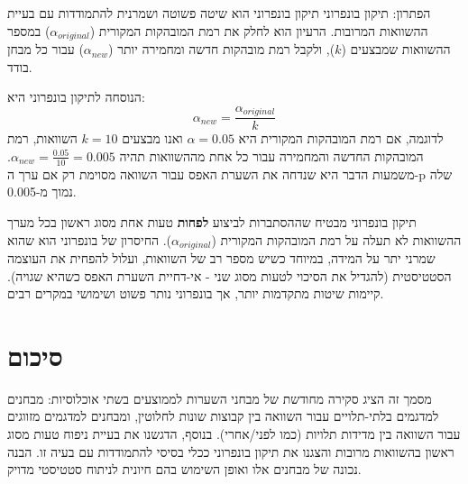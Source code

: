 \documentclass[12pt]{article}
\begin{document}
\begin{definitionBox}{הפתרון: תיקון בונפרוני}
תיקון בונפרוני הוא שיטה פשוטה ושמרנית להתמודדות עם בעיית ההשוואות המרובות. הרעיון הוא לחלק את רמת המובהקות המקורית (\(\alpha_{original}\)) במספר ההשוואות שמבצעים (\(k\)), ולקבל רמת מובהקות חדשה ומחמירה יותר (\(\alpha_{new}\)) עבור כל מבחן בודד.

\vspace{0.5\baselineskip} %
הנוסחה לתיקון בונפרוני היא:
\[ \alpha_{new} = \frac{\alpha_{original}}{k} \]
לדוגמה, אם רמת המובהקות המקורית היא \(\alpha = 0.05\) ואנו מבצעים \(k=10\) השוואות, רמת המובהקות החדשה והמחמירה עבור כל אחת מההשוואות תהיה \(\alpha_{new} = \frac{0.05}{10} = 0.005\). משמעות הדבר היא שנדחה את השערת האפס עבור השוואה מסוימת רק אם ערך ה-p שלה נמוך מ-0.005.

תיקון בונפרוני מבטיח שההסתברות לביצוע \textbf{לפחות} טעות אחת מסוג ראשון בכל מערך ההשוואות לא תעלה על רמת המובהקות המקורית (\(\alpha_{original}\)). החיסרון של בונפרוני הוא שהוא שמרני יתר על המידה, במיוחד כשיש מספר רב של השוואות, ועלול להפחית את העוצמה הסטטיסטית (להגדיל את הסיכוי לטעות מסוג שני - אי-דחיית השערת האפס כשהיא שגויה). קיימות שיטות מתקדמות יותר, אך בונפרוני נותר פשוט ושימושי במקרים רבים.
\end{definitionBox}

\section{סיכום}
מסמך זה הציג סקירה מחודשת של מבחני השערות לממוצעים בשתי אוכלוסיות: מבחנים למדגמים בלתי-תלויים עבור השוואה בין קבוצות שונות לחלוטין, ומבחנים למדגמים מזווגים עבור השוואה בין מדידות תלויות (כמו לפני/אחרי). בנוסף, הדגשנו את בעיית ניפוח טעות מסוג ראשון בהשוואות מרובות והצגנו את תיקון בונפרוני ככלי בסיסי להתמודדות עם בעיה זו. הבנה נכונה של מבחנים אלו ואופן השימוש בהם חיונית לניתוח סטטיסטי מדויק.
\end{document}
